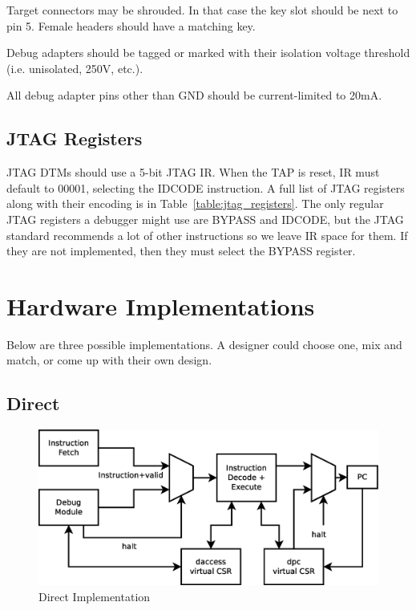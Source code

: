 \documentclass{article}
\begin{document}
Target connectors may be shrouded. In that case the key slot should be next to
pin 5. Female headers should have a matching key.

Debug adapters should be tagged or marked with their isolation voltage
threshold (i.e. unisolated, 250V, etc.).

All debug adapter pins other than GND should be current-limited to 20mA.

\subsection{JTAG Registers}

JTAG DTMs should use a 5-bit JTAG IR. When the TAP is reset, IR must default to
00001, selecting the IDCODE instruction. A full list of JTAG registers along
with their encoding is in Table~\ref{table:jtag_registers}. The only regular
JTAG registers a debugger might use are BYPASS and IDCODE, but the JTAG
standard recommends a lot of other instructions so we leave IR space for them.
If they are not implemented, then they must select the BYPASS register.



\newpage
\appendix

\section{Hardware Implementations}

Below are three possible implementations. A designer could choose one, mix and
match, or come up with their own design.

\subsection{Direct}

\begin{figure}
   \centering
   \includegraphics[width=\textwidth]{direct.eps}
   \caption{Direct Implementation}
   \label{fig:direct}
\end{figure}
\end{document}
